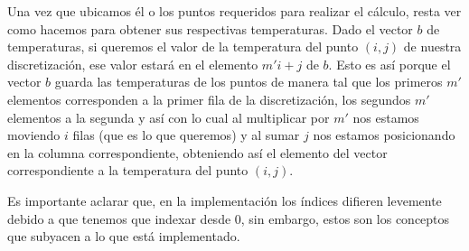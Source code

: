 Una vez que ubicamos él o los puntos requeridos para realizar el cálculo, resta ver como hacemos para obtener sus respectivas temperaturas. Dado el vector $b$ de temperaturas, si queremos el valor de la temperatura del punto $(i, j)$ de nuestra discretización, ese valor estará en el elemento $m'i + j$ de $b$. Esto es así porque el vector $b$ guarda las temperaturas de los puntos de manera tal que los primeros $m'$ elementos corresponden a la primer fila de la discretización, los segundos $m'$ elementos a la segunda y así con lo cual al multiplicar por $m'$ nos estamos moviendo $i$ filas (que es lo que queremos) y al sumar $j$ nos estamos posicionando en la columna correspondiente, obteniendo así el elemento del vector correspondiente a la temperatura del punto $(i, j)$.
\par Es importante aclarar que, en la implementación los índices difieren levemente debido a que tenemos que indexar desde 0, sin embargo, estos son los conceptos que subyacen a lo que está implementado.

